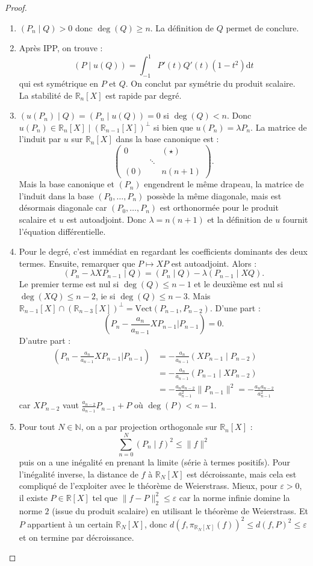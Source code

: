 \documentclass[french]{article}
\newcommand{\N}{\mathbb{N}}
\newcommand{\R}{\mathbb{R}}
\newcommand{\Vect}{\text{Vect}}
\renewcommand{\d}{\text{d}}
\theoremstyle{definition}
\newtheorem*{rmq}{Remarque}
\begin{document}
\begin{proof}
\begin{enumerate}
\begin{rmq}
		\end{rmq}
		\item $(P_n\mid Q)>0$ donc $\deg(Q)\geqslant n$. La définition de $Q$ permet de conclure.
		\item Après IPP, on trouve :
		$$(P\mid u(Q))=\int_{-1}^{1}P'(t)Q'(t)(1-t^2)\d t$$ qui est symétrique en $P$ et $Q$. On conclut par symétrie du produit scalaire.\\
		La stabilité de $\R_n[X]$ est rapide par degré.
		\item $(u(P_n)\mid Q)=(P_n\mid u(Q))=0$ si $\deg(Q)<n$. Donc $u(P_n)\in\R_n[X]\mid(\R_{n-1}[X])^\bot$ si bien que $u(P_n)=\lambda P_n$. La matrice de l'induit par $u$ sur $\R_n[X]$ dans la base canonique est :
		$$\begin{pmatrix}
			0&&(\star)\\
			&\ddots&\\
			(0)&&n(n+1)
		\end{pmatrix}.$$
		Mais la base canonique et $(P_n)$ engendrent le même drapeau, la matrice de l'induit dans la base $(P_0,\ldots,P_n)$ possède la même diagonale, mais est désormais diagonale car $(P_0,\ldots,P_n)$ est orthonormée pour le produit scalaire et $u$ est autoadjoint. Donc $\lambda=n(n+1)$ et la définition de $u$ fournit l'équation différentielle.
		\item Pour le degré, c'est immédiat en regardant les coefficients dominants des deux termes. Ensuite, remarquer que $P\mapsto XP$ est autoadjoint. Alors :
		$$(P_n-\lambda XP_{n-1}\mid Q)=(P_n\mid Q)-\lambda (P_{n-1}\mid XQ).$$
		Le premier terme est nul si $\deg(Q)\leqslant n-1$ et le deuxième est nul si $\deg(XQ)\leqslant n-2$, ie si $\deg(Q)\leqslant n-3$. Mais $\R_{n-1}[X]\cap(\R_{n-3}[X])^\bot=\Vect(P_{n-1},P_{n-2})$. D'une part :
		$$\left(P_n-\frac{a_n}{a_{n-1}}XP_{n-1}\bigg| P_{n-1}\right)=0.$$
		D'autre part :
		\begin{align*}
			\left(P_n-\frac{a_n}{a_{n-1}}XP_{n-1}\bigg| P_{n-1}\right)&=-\frac{a_n}{a_{n-1}}(XP_{n-1}\mid P_{n-2})\\
			&=-\frac{a_n}{a_{n-1}}(P_{n-1}\mid XP_{n-2})\\
			&=-\frac{a_n a_{n-2}}{a_{n-1}^2}\lVert P_{n-1}\rVert^2=-\frac{a_n a_{n-2}}{a_{n-1}^2}
		\end{align*} car $XP_{n-2}$ vaut $\displaystyle\frac{a_{n-2}}{a_{n-1}}P_{n-1}+P$ où $\deg(P)<n-1$.
		\item Pour tout $N\in\N$, on a par projection orthogonale sur 
		$\R_{n}[X]$ : 
		$$\sum_{n=0}^{N}(P_n\mid f)^2\leqslant\lVert f\rVert^2$$  puis on a une inégalité en prenant la limite (série à termes positifs). Pour l'inégalité inverse, la distance de $f$ à $\R_N[X]$ est décroissante, mais cela est compliqué de l'exploiter avec le théorème de Weierstrass. Mieux, pour $\varepsilon>0$, il existe $P\in\R[X]$ tel que $\lVert f-P\rVert_2^2\leqslant\varepsilon$ car la norme infinie domine la norme $2$ (issue du produit scalaire) en utilisant le théorème de Weierstrass. Et $P$ appartient à un certain $\R_N[X]$, donc $d(f,\pi_{\R_N[X]}(f))^2\leqslant d(f,P)^2\leqslant\varepsilon$ et on termine par décroissance.

\end{enumerate}
\end{proof}
\end{document}
